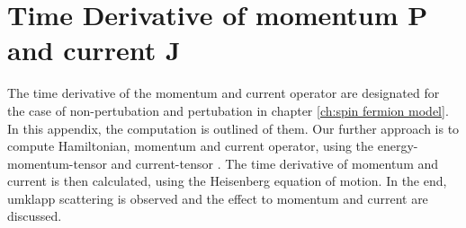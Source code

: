 %
%
%
\chapter{Time Derivative of momentum P and current J}
\label{appch:time derivative P and J}
%
%
%
The time derivative of the momentum and current operator are designated for the case of non-pertubation and pertubation in chapter \ref{ch:spin fermion model}.
In this appendix, the computation is outlined of them.
Our further approach is to compute Hamiltonian, momentum and current operator, using the energy-momentum-tensor and current-tensor \cite{Iliev}.
The time derivative of momentum and current is then calculated, using the Heisenberg equation of motion.
In the end, umklapp scattering is observed and the effect to momentum and current are discussed.

